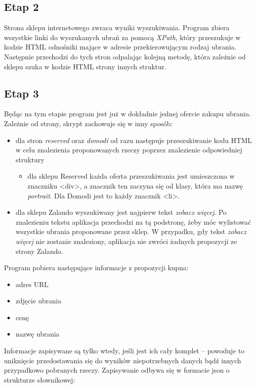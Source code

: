 \subsection{Etap 2}
	Strona sklepu internetowego zwraca wyniki wyszukiwania. Program zbiera wszystkie linki do wyszukanych ubrań za pomocą \emph{XPath}, który przeszukuje w kodzie HTML odnośniki mające w adresie przekierowującym rodzaj ubrania. Następnie przechodzi do tych stron odpalając kolejną metodę, która zależnie od sklepu szuka w kodzie HTML strony innych struktur.

\subsection{Etap 3}
	Będąc na tym etapie program jest już w dokładnie jednej ofercie zakupu ubrania. Zależnie od strony, skrypt zachowuje się w inny sposób:
\begin{itemize}
	 \item dla stron \emph{reserved} oraz \emph{domodi} od razu następuje przeszukiwanie kodu HTML w celu znalezienia proponowanych rzeczy poprzez znalezienie odpowiedniej struktury
		\begin{itemize} 
			\item dla sklepu Reserved każda oferta przeszukiwania jest umieszczona w znaczniku \textless div\textgreater, a znacznik ten zaczyna się od klasy, która ma nazwę \emph{portrait}. Dla Domodi jest to każdy 	znacznik \textless li\textgreater.
		\end{itemize}
	\item dla sklepu Zalando wyszukiwany jest najpierw tekst \emph{zobacz więcej}. Po znalezieniu tekstu aplikacja przechodzi na tą podstronę, żeby móc wylistować wszystkie ubrania proponowane przez sklep. W przypadku, gdy tekst \emph{zobacz więcej} nie zostanie znaleziony, aplikacja nie zwróci żadnych propozycji ze strony Zalando.\end{itemize}
Program pobiera następujące informacje z propozycji kupna:
\begin{itemize}
	\item adres URL
	\item zdjęcie ubrania
	\item cenę
	\item nazwę ubrania
\end{itemize}
Informacje zapisywane są tylko wtedy, jeśli jest ich cały komplet – powoduje to uniknięcie przedostawania się do wyników niepotrzebnych danych bądź innych przypadkowo pobranych rzeczy.
Zapisywanie odbywa się w formacie json o strukturze słownikowej:
